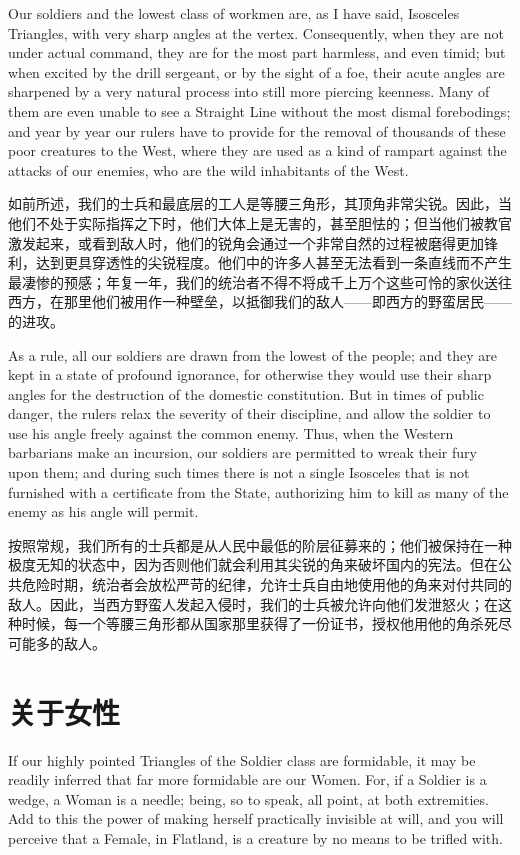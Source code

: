\documentclass[12pt,UTF8]{ctexbook}
\begin{document}
Our soldiers and the lowest class of workmen are, as I have said, Isosceles Triangles, with very sharp angles at the vertex. Consequently, when they are not under actual command, they are for the most part harmless, and even timid; but when excited by the drill sergeant, or by the sight of a foe, their acute angles are sharpened by a very natural process into still more piercing keenness. Many of them are even unable to see a Straight Line without the most dismal forebodings; and year by year our rulers have to provide for the removal of thousands of these poor creatures to the West, where they are used as a kind of rampart against the attacks of our enemies, who are the wild inhabitants of the West.

如前所述，我们的士兵和最底层的工人是等腰三角形，其顶角非常尖锐。因此，当他们不处于实际指挥之下时，他们大体上是无害的，甚至胆怯的；但当他们被教官激发起来，或看到敌人时，他们的锐角会通过一个非常自然的过程被磨得更加锋利，达到更具穿透性的尖锐程度。他们中的许多人甚至无法看到一条直线而不产生最凄惨的预感；年复一年，我们的统治者不得不将成千上万个这些可怜的家伙送往西方，在那里他们被用作一种壁垒，以抵御我们的敌人——即西方的野蛮居民——的进攻。

As a rule, all our soldiers are drawn from the lowest of the people; and they are kept in a state of profound ignorance, for otherwise they would use their sharp angles for the destruction of the domestic constitution. But in times of public danger, the rulers relax the severity of their discipline, and allow the soldier to use his angle freely against the common enemy. Thus, when the Western barbarians make an incursion, our soldiers are permitted to wreak their fury upon them; and during such times there is not a single Isosceles that is not furnished with a certificate from the State, authorizing him to kill as many of the enemy as his angle will permit.

按照常规，我们所有的士兵都是从人民中最低的阶层征募来的；他们被保持在一种极度无知的状态中，因为否则他们就会利用其尖锐的角来破坏国内的宪法。但在公共危险时期，统治者会放松严苛的纪律，允许士兵自由地使用他的角来对付共同的敌人。因此，当西方野蛮人发起入侵时，我们的士兵被允许向他们发泄怒火；在这种时候，每一个等腰三角形都从国家那里获得了一份证书，授权他用他的角杀死尽可能多的敌人。

\chapter{关于女性}

If our highly pointed Triangles of the Soldier class are formidable, it may be readily inferred that far more formidable are our Women. For, if a Soldier is a wedge, a Woman is a needle; being, so to speak, all point, at both extremities. Add to this the power of making herself practically invisible at will, and you will perceive that a Female, in Flatland, is a creature by no means to be trifled with.
\end{document}
